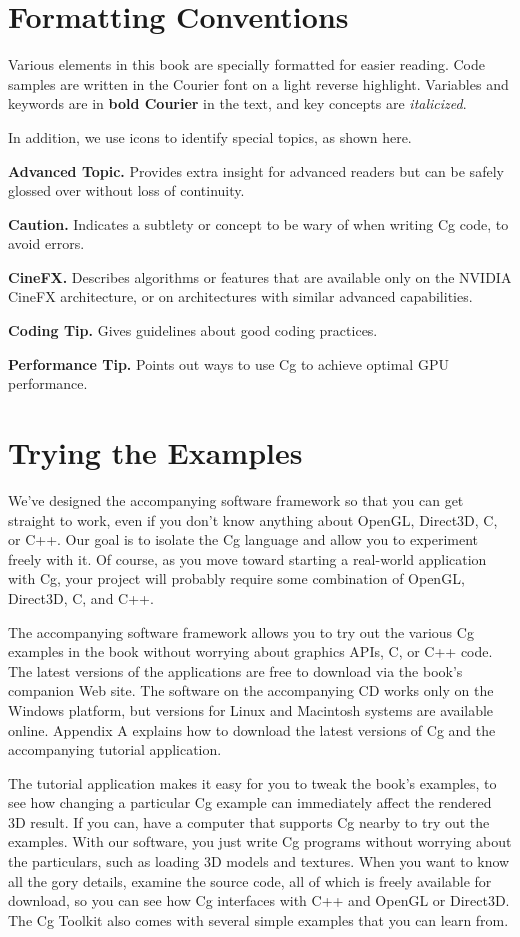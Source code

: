 \documentclass[../main.tex]{subfiles}
\begin{document}
\section*{Formatting Conventions}

Various elements in this book are specially formatted for easier reading. Code samples are written in the Courier font on a light reverse highlight. Variables and keywords are in \textbf{bold Courier} in the text, and key concepts are \textit{italicized}.

In addition, we use icons to identify special topics, as shown here.

\textbf{Advanced Topic.} Provides extra insight for advanced readers but can be safely glossed over without loss of continuity.

\textbf{Caution.} Indicates a subtlety or concept to be wary of when writing Cg code, to avoid errors.

\textbf{CineFX.} Describes algorithms or features that are available only on the NVIDIA CineFX architecture, or on architectures with similar advanced capabilities.

\textbf{Coding Tip.} Gives guidelines about good coding practices.

\textbf{Performance Tip.} Points out ways to use Cg to achieve optimal GPU performance.

\section*{Trying the Examples}

We've designed the accompanying software framework so that you can get straight to work, even if you don't know anything about OpenGL, Direct3D, C, or C++. Our goal is to isolate the Cg language and allow you to experiment freely with it. Of course, as you move toward starting a real-world application with Cg, your project will probably require some combination of OpenGL, Direct3D, C, and C++.

The accompanying software framework allows you to try out the various Cg examples in the book without worrying about graphics APIs, C, or C++ code. The latest versions of the applications are free to download via the book's companion Web site. The software on the accompanying CD works only on the Windows platform, but versions for Linux and Macintosh systems are available online. Appendix A explains how to download the latest versions of Cg and the accompanying tutorial application.

The tutorial application makes it easy for you to tweak the book's examples, to see how changing a particular Cg example can immediately affect the rendered 3D result. If you can, have a computer that supports Cg nearby to try out the examples. With our software, you just write Cg programs without worrying about the particulars, such as loading 3D models and textures. When you want to know all the gory details, examine the source code, all of which is freely available for download, so you can see how Cg interfaces with C++ and OpenGL or Direct3D. The Cg Toolkit also comes with several simple examples that you can learn from.
\end{document}
